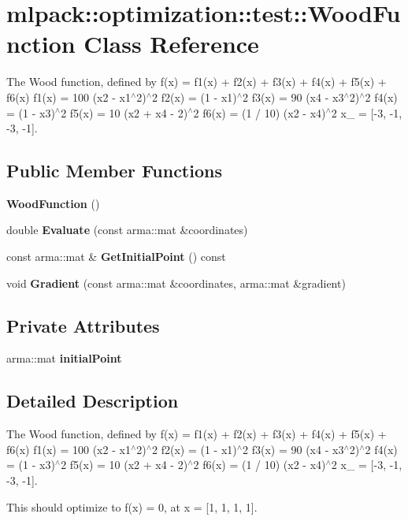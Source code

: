 \section{mlpack\+:\+:optimization\+:\+:test\+:\+:Wood\+Function Class Reference}
\label{classmlpack_1_1optimization_1_1test_1_1WoodFunction}


The Wood function, defined by f(x) = f1(x) + f2(x) + f3(x) + f4(x) + f5(x) + f6(x) f1(x) = 100 (x2 -\/ x1$^\wedge$2)$^\wedge$2 f2(x) = (1 -\/ x1)$^\wedge$2 f3(x) = 90 (x4 -\/ x3$^\wedge$2)$^\wedge$2 f4(x) = (1 -\/ x3)$^\wedge$2 f5(x) = 10 (x2 + x4 -\/ 2)$^\wedge$2 f6(x) = (1 / 10) (x2 -\/ x4)$^\wedge$2 x\+\_ = [-\/3, -\/1, -\/3, -\/1].  


\subsection*{Public Member Functions}
\begin{DoxyCompactItemize}
\item 
{\bf Wood\+Function} ()
\item 
double {\bf Evaluate} (const arma\+::mat \&coordinates)
\item 
const arma\+::mat \& {\bf Get\+Initial\+Point} () const 
\item 
void {\bf Gradient} (const arma\+::mat \&coordinates, arma\+::mat \&gradient)
\end{DoxyCompactItemize}
\subsection*{Private Attributes}
\begin{DoxyCompactItemize}
\item 
arma\+::mat {\bf initial\+Point}
\end{DoxyCompactItemize}


\subsection{Detailed Description}
The Wood function, defined by f(x) = f1(x) + f2(x) + f3(x) + f4(x) + f5(x) + f6(x) f1(x) = 100 (x2 -\/ x1$^\wedge$2)$^\wedge$2 f2(x) = (1 -\/ x1)$^\wedge$2 f3(x) = 90 (x4 -\/ x3$^\wedge$2)$^\wedge$2 f4(x) = (1 -\/ x3)$^\wedge$2 f5(x) = 10 (x2 + x4 -\/ 2)$^\wedge$2 f6(x) = (1 / 10) (x2 -\/ x4)$^\wedge$2 x\+\_ = [-\/3, -\/1, -\/3, -\/1]. 

This should optimize to f(x) = 0, at x = [1, 1, 1, 1].

